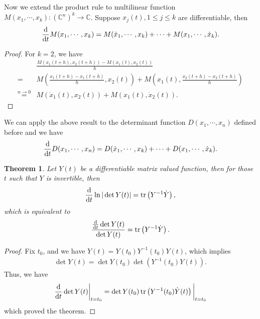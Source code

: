 \documentclass[11pt]{book}
\newtheorem{theorem}{Theorem}[section]
\theoremstyle{definition}
\numberwithin{equation}{subsection}
\begin{document}
Now we extend the product rule to multilinear function $M(x_1,\cdots, x_k): \left(\mathbb{C}^n\right)^k \to \mathbb{C}$. Suppose $x_j(t), 1\leq j \leq k$ are differentiable, then 
\begin{align*}
    \dv{}{t}M(x_1,\cdots, x_k) = M(\dot{x}_1,\cdots, x_k) + \cdots + M(x_1,\cdots, \dot{x}_k).
\end{align*}
\begin{proof}
For $k=2$, we have
\begin{align*}
    & \frac{M(x_1(t+h), x_2(t+h)) - M(x_1(t), x_2(t))}{h} \\
    = & M\left(\frac{x_1(t+h)-x_1(t+h)}{h}, x_2(t)\right) + M\left(x_1(t),\frac{x_2(t+h)-x_2(t+h)}{h} \right) \\
    \overset{n\to 0}{=} & M(\dot{x}_1(t), x_2(t)) + M(x_1(t), \dot{x}_2(t)).
\end{align*}
\end{proof}

We can apply the above result to the determinant function $D(x_1,\cdots,x_n)$ defined before and we have
\begin{align*}
    \dv{}{t}D(x_1,\cdots,x_n) = D(\dot{x}_1,\cdots, x_k) + \cdots + D(x_1,\cdots, \dot{x}_k).
\end{align*}

\medskip

\begin{theorem}
Let $Y(t)$ be a differentiable matrix valued function, then for those $t$ such that $Y$ is invertible, then
\begin{align*}
    \dv{}{t} \ln |\det Y(t)| = \tr \left(Y^{-1} \dot{Y}\right),
\end{align*}
which is equivalent to 
\begin{align*}
    \frac{\dv{}{t}\det Y(t)}{\det Y(t)} = \tr \left(Y^{-1} \dot{Y}\right).
\end{align*}
\end{theorem}
\begin{proof}
Fix $t_0$, and we have $Y(t) = Y(t_0) Y^{-1}(t_0) Y(t)$, which implies
\begin{align*}
    \det Y(t) = \det Y(t_0) \det (Y^{-1}(t_0) Y(t)).
\end{align*}
Thus, we have
\begin{align*}
    \dv{}{t}\det Y(t)\bigg|_{t=t_0} = \det Y(t_0) \tr \left(Y^{-1}(t_0) \dot{Y}(t) \right)\bigg|_{t=t_0}
\end{align*}
which proved the theorem.
\end{proof}
\end{document}
